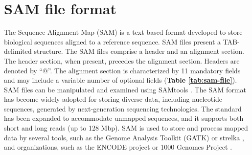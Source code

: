 \documentclass[a4paper, titlepage, openright]{book}
\begin{document}
\section{SAM file format}\label{section:sam-format}
The Sequence Alignment Map (SAM) \citep{li2009sequence} is a text-based format developed to store biological sequences aligned to a reference sequence. SAM files present a TAB-delimited structure. The SAM files comprise a header and an alignment section.  The header section, when present, precedes the alignment section. Headers are denoted by ``@''. The alignment section is characterized by 11 mandatory fields and may include a variable number of optional fields (\textbf{Table \ref{tab:sam-file}}). SAM files can be manipulated and examined using SAMtools \citep{li2009sequence}.
The SAM format has become widely adopted for storing diverse data, including nucleotide sequences, generated by next-generation sequencing technologies. The standard has been expanded to accommodate unmapped sequences, and it supports both short and long reads (up to 128 Mbp). SAM is used to store and process mapped data by several tools, such as the Genome Analysis Toolkit (GATK) \citep{mckenna2010genome} or strelka \citep{kim2018strelka2}, and organizations, such as the ENCODE project \citep{encode2012integrated} or 1000 Genomes Project \citep{10002015global}.
\end{document}
